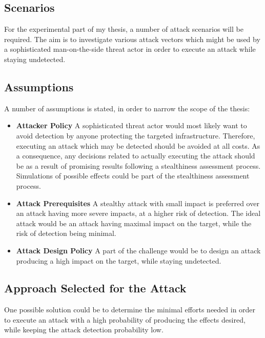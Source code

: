 \subsection{Scenarios}

For the experimental part of my thesis, a number of attack scenarios will be required. The aim is to investigate various attack vectors which might be used by a sophisticated man-on-the-side threat actor in order to execute an attack while staying undetected. 

\subsection{Assumptions} 

A number of assumptions is stated, in order to narrow the scope of the thesis:

\begin{itemize}
    
\item \textbf{Attacker Policy} 
A sophisticated threat actor would most likely want to avoid detection by anyone protecting the targeted infrastructure.
Therefore, executing an attack which may be detected should be avoided at all costs.
As a consequence, any decisions related to actually executing the attack should be as a result of promising results following a stealthiness assessment process. Simulations of possible effects could be part of the stealthiness assessment process. 

\item \textbf{Attack Prerequisites} 
A stealthy attack with small impact is preferred over an attack having more severe impacts, at a higher risk of detection.
The ideal attack would be an attack having maximal impact on the target, while the risk of detection being minimal. 


\item \textbf{Attack Design Policy} 
A part of the challenge would be to design an attack producing a high impact on the target, while staying undetected.
\end{itemize}
\subsection{Approach Selected for the Attack} 
One possible solution could be to determine the minimal efforts needed in order to execute an attack with a high probability of producing the effects desired, while keeping the attack detection probability low.




